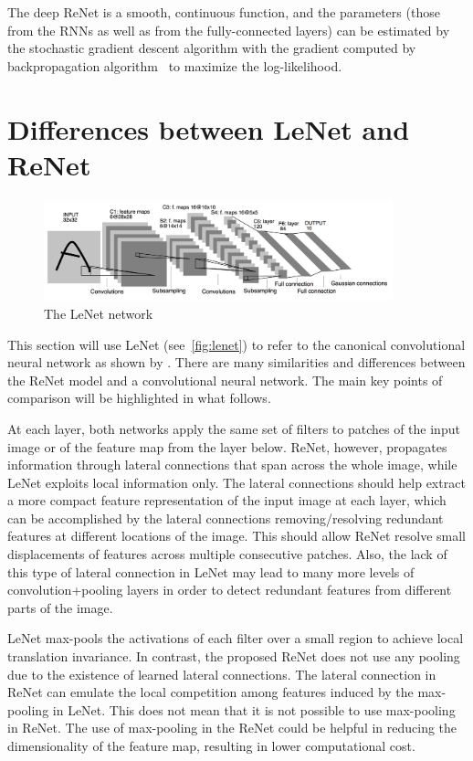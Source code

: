 The deep ReNet is a smooth, continuous function, and the parameters (those from
the RNNs as well as from the fully-connected layers) can be estimated by the
stochastic gradient descent algorithm with the gradient computed by
backpropagation algorithm~\citep[see, e.g.,][]{BP86} to maximize the
log-likelihood.

\section{Differences between LeNet and ReNet}
\label{sec:lenetrenet}

\begin{figure}
    \centering
    \includegraphics[width=0.9\textwidth]{img/lenet5.jpg}
    \caption{The LeNet network}
    \label{fig:lenet}
    \vspace{-3mm}
\end{figure}

This section will use LeNet (see~\autoref{fig:lenet}) to refer to the canonical
convolutional neural network as shown by \citet{LeCun89}. There are many
similarities and differences between the ReNet model and a convolutional neural
network. The main key points of comparison will be highlighted in what follows.

At each layer, both networks apply the same set of filters to patches of the
input image or of the feature map from the layer below. ReNet, however,
propagates information through lateral connections that span across the whole
image, while LeNet exploits local information only. The lateral connections
should help extract a more compact feature representation of the input image at
each layer, which can be accomplished by the lateral connections
removing/resolving redundant features at different locations of the image. This
should allow ReNet resolve small displacements of features across multiple
consecutive patches. Also, the lack of this type of lateral connection in LeNet
may lead to many more levels of convolution+pooling layers in order to detect
redundant features from different parts of the image.

LeNet max-pools the activations of each filter over a small region to achieve
local translation invariance. In contrast, the proposed ReNet does not use any
pooling due to the existence of learned lateral connections. The lateral
connection in ReNet can emulate the local competition among features induced by
the max-pooling in LeNet.  This does not mean that it is not possible to use
max-pooling in ReNet. The use of max-pooling in the ReNet could be helpful in
reducing the dimensionality of the feature map, resulting in lower computational
cost.

